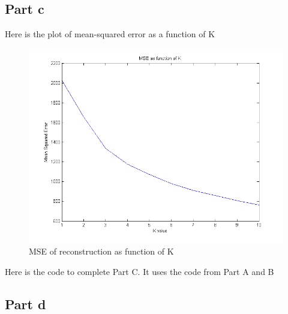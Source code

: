 \documentclass[twoside,11pt]{article}
\theoremstyle{definition}
\begin{document}
\newpage

\subsection*{Part c}

Here is the plot of mean-squared error as a function of K
\begin{figure}[h]
\centering
\includegraphics[width=6 in]{prob3PartC.png}
\caption{MSE of reconstruction as function of K}
\end{figure}

Here is the code to complete Part C. It uses the code from Part A and B


\newpage

\subsection*{Part d}
\end{document}
